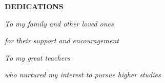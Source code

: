 \thispagestyle{plain}
\vskip 1.2cm
%
\centerline{{\bf {\large DEDICATIONS}}}
%
\vskip 8.0cm
%
\centerline{\textit{\Large To my family and other loved ones}}
\centerline{\textit{\Large for their support and encouragement}}
\vskip 1.5cm
\centerline{\textit{\Large To my great teachers}}
\centerline{\textit{\Large who nurtured my interest to pursue higher studies}}
